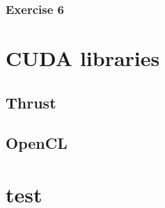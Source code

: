 \documentclass[12px,oz]{report}
\begin{document}
		\subsection{Exercise 6}
	
\chapter{CUDA libraries}
\label{ch-libraries}


	\section{Thrust}
	\label{sec-thrust}
	
	
	\section{OpenCL}
	\label{sec-opencl}
	

\cite{McCool2012}
\cite{udacity:parallel}




\appendix
\chapter{test}
\end{document}
